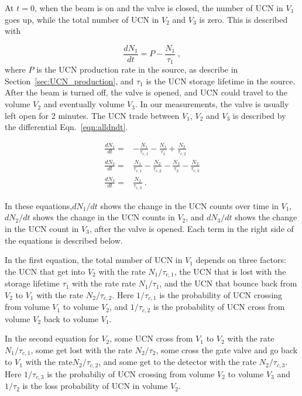 At $t = 0$, when the beam is on and the valve is closed, the number of UCN in
$V_1$ goes up, while the total number of UCN in $V_2$ and $V_3$ is
zero. This is described with 

\begin{equation}
  \label{eqn:dndt}
\frac{dN_1}{dt} = P - \frac{N_1}{\tau_1}~,
\end{equation}
where $P$ is the UCN production rate in the source, as describe in
Section~\ref{sec:UCN_production}, and $\tau_1$ is the UCN storage
lifetime in the source. After the beam is turned off, the valve is
opened, and UCN could travel to the volume $V_2$ and eventually volume
$V_3$. In our measurements, the valve is usually left open for 2
minutes. The UCN trade between $V_1$, $V_2$ and $V_3$ is described by
the differential Eqn.~\ref{eqn:alldndt}.

\begin{equation}
  \label{eqn:alldndt}
  \begin{aligned}
    \frac{dN_1}{dt} =&- \frac{N_1}{\tau_{c,1}} - \frac{N_1}{\tau_1} + \frac{N_2}{\tau_{c,2}}  \\
    \frac{dN_2}{dt} =& \frac{N_1}{\tau_{c,1}} - \frac{N_2}{\tau_{c,2}} - \frac{N_2}{\tau_2} - \frac{N_2}{\tau_{c,3}} \\
    \frac{dN_3}{dt} =& \frac{N_2}{\tau_{c,3}}~.
  \end{aligned}
\end{equation}


In these equations,$dN_1/dt$ shows the change in the UCN counts over
time in $V_1$, $dN_2/dt$ shows the change in the UCN
counts in $V_2$, and $dN_3/dt$ shows the
change in the UCN count in $V_3$, after the valve is opened. Each term
in the right side of the equations is described below.

In the first equation, the total number of UCN in $V_1$ depends on
three factors: the UCN that get into $V_2$ with the rate
$N_1/\tau_{c,1}$, the UCN that is lost with the storage lifetime
$\tau_1$ with the rate rate $N_1/\tau_{1}$, and the UCN that bounce
back from $V_2$ to $V_1$ with the rate $N_2/\tau_{c,2}$. Here
$1/\tau_{c,1}$ is the probability of UCN crossing from volume $V_1$ to
volume $V_2$, and $1/\tau_{c,2}$ is the probability of UCN cross from
volume $V_2$ back to volume $V_1$.


In the second equation for $V_2$, some UCN cross from $V_1$ to $V_2$
with the rate $N_1/\tau_{c,1}$, some get lost with the rate
$N_2/\tau_2$, some cross the gate valve and go back to $V_1$ with the
rate$N_2/\tau_{c,2}$, and some get to the detector with the rate
$N_2/\tau_{c,3}$. Here $1/\tau_{c,3}$ is the probabiliy of UCN
crossing from volume $V_2$ to volume $V_3$ and $1/\tau_2$ is the loss
probability of UCN in volume $V_2$.



